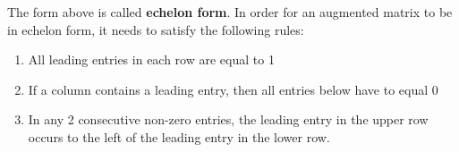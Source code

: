 \documentclass[table]{article}
\theoremstyle{definition}
\begin{document}
  The form above is called \textbf{echelon form}. In order for an augmented matrix to be in echelon form, it needs to satisfy the following rules:
  \begin{enumerate}
    \item All leading entries in each row are equal to 1
    \item If a column contains a leading entry, then all entries below have to equal 0
    \item In any 2 consecutive non-zero entries, the leading entry in the upper row occurs to the left of the leading entry in the lower row.
  \end{enumerate}
  
\end{document}
